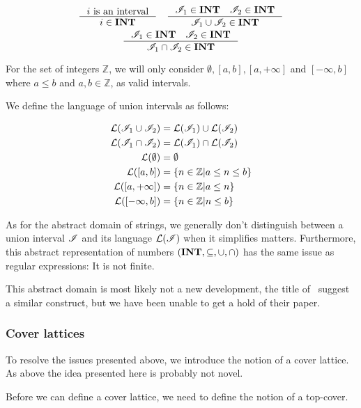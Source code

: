 \begin{gather*}
    \inference{i \text{ is an interval}}{i \in \mathbf{INT}} \quad
    \inference{\mathscr{I}_1 \in \textbf{INT} \quad \mathscr{I}_2 \in \textbf{INT}}{\mathscr{I}_1 \cup  \mathscr{I}_2 \in \mathbf{INT}}\\
    \inference{\mathscr{I}_1 \in \textbf{INT} \quad \mathscr{I}_2 \in \textbf{INT}}{\mathscr{I}_1 \cap  \mathscr{I}_2 \in \mathbf{INT}}
\end{gather*}


For the set of integers $\mathbb{Z}$, we will only consider $\emptyset, [a, b], [a, +\infty]$ and $[-\infty, b]$ where $a \leq b$ and $a, b \in \mathbb{Z}$, as valid intervals.

We define the language of union intervals as follows:


\begin{align*}
    \mathcal{L}(\mathscr{I}_1 \cup \mathscr{I}_2) &= \mathcal{L}(\mathscr{I}_1) \cup \mathcal{L}(\mathscr{I}_2) \\
    \mathcal{L}(\mathscr{I}_1 \cap \mathscr{I}_2) &= \mathcal{L}(\mathscr{I}_1) \cap \mathcal{L}(\mathscr{I}_2) \\
    \mathcal{L}(\emptyset) &= \emptyset \\
    \mathcal{L}([a, b]) &= \left\{ n \in \mathbb{Z} \middle| a \leq n \leq b \right\} \\
    \mathcal{L}([a, +\infty]) &= \left\{ n \in \mathbb{Z} \middle| a \leq n \right\} \\
    \mathcal{L}([-\infty, b]) &= \left\{ n \in \mathbb{Z} \middle| n \leq b \right\}
\end{align*}


As for the abstract domain of strings, we generally don't distinguish between a union interval $\mathscr{I}$ and its language $\mathcal{L}(\mathscr{I})$ when it simplifies matters.
Furthermore, this abstract representation of numbers $(\mathbf{INT}, \subseteq, \cup, \cap)$ has the same issue as regular expressions: It is not finite.

This abstract domain is most likely not a new development, the title of~\cite{li2010abstract} suggest a similar construct, but we have been unable to get a hold of their paper.

\subsubsection{Cover lattices}\label{subsubsec:cover-lattice}
To resolve the issues presented above, we introduce the notion of a cover lattice.
As above the idea presented here is probably not novel.

Before we can define a cover lattice, we need to define the notion of a top-cover.


